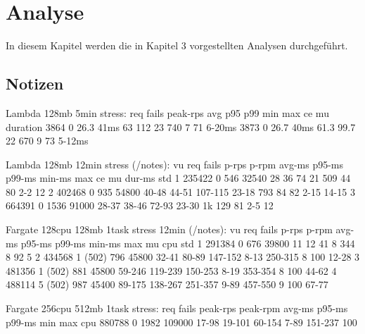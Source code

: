 \chapter{Analyse}
In diesem Kapitel werden die in Kapitel 3 vorgestellten Analysen durchgeführt.

\section{Notizen}

Lambda 128mb 5min stress:
req     fails   peak-rps    avg     p95     p99     min     max     ce  mu  duration 
3864    0       26.3        41ms    63      112     23      740     7   71  6-20ms
3873    0       26.7        40ms    61.3    99.7    22      670     9   73  5-12ms

Lambda 128mb 12min stress (/notes):
vu  req     fails   p-rps   p-rpm   avg-ms  p95-ms  p99-ms  min-ms  max ce  mu  dur-ms  std
1   235422  0       546     32540   28      36      74      21      509 44  80  2-2     12
2   402468  0       935     54800   40-48   44-51   107-115 23-18   793 84  82  2-15    14-15
3   664391  0       1536    91000   28-37   38-46   72-93   23-30   1k  129 81  2-5     12

Fargate 128cpu 128mb 1task stress 12min (/notes):
vu  req     fails   p-rps   p-rpm   avg-ms  p95-ms  p99-ms  min-ms  max     mu  cpu     std
1   291384  0       676     39800   11      12      41      8       344     8   92      5
2   434568  1 (502) 796     45800   32-41   80-89   147-152 8-13    250-315 8   100     12-28
3   481356  1 (502) 881     45800   59-246  119-239 150-253 8-19    353-354 8   100     44-62
4   488114  5 (502) 987     45400   89-175  138-267 251-357 9-89    457-550 9   100     67-77

Fargate 256cpu 512mb 1task stress:
req     fails   peak-rps    peak-rpm    avg-ms  p95-ms  p99-ms  min     max     cpu
880788  0       1982        109000      17-98   19-101  60-154  7-89    151-237 100
